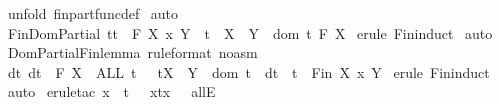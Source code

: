\begin{isabellebody}
%
\isadelimproof
%
\endisadelimproof
%
\isatagproof
{}\isamarkupfalse%
\ {\isacharparenleft}unfold\ fin{\isacharunderscore}part{\isacharunderscore}func{\isacharunderscore}def{\isacharparenright}\isanewline
{}\isamarkupfalse%
\ auto\isanewline
{}\isamarkupfalse%
%
\endisatagproof
{\isafoldproof}%
%
\isadelimproof
\isanewline
%
\endisadelimproof
\isanewline
\isanewline
{}\isamarkupfalse%
\ Fin{\isacharunderscore}Dom{\isacharunderscore}Partial{\isacharcolon}\ {\isachardoublequoteopen}{\isacharbang}{\isacharbang}t{\isachardot}{\isacharbrackleft}{\isacharbar}t\ {\isacharcolon}\ {\isacharpercent}F\ {\isacharparenleft}X\ {\isacharpercent}x\ Y{\isacharparenright}\ {\isacharsemicolon}\ t\ {\isacharcolon}\ {\isacharparenleft}X\ {\isacharminus}{\isacharbar}{\isacharminus}{\isachargreater}\ Y{\isacharparenright}{\isacharbar}{\isacharbrackright}\ {\isacharequal}{\isacharequal}{\isachargreater}\ {\isacharparenleft}dom\ t{\isacharcolon}\ {\isacharpercent}F\ X{\isacharparenright}{\isachardoublequoteclose}\isanewline
%
\isadelimproof
%
\endisadelimproof
%
\isatagproof
{}\isamarkupfalse%
\ {\isacharparenleft}erule\ Fin{\isacharunderscore}induct{\isacharparenright}\isanewline
{}\isamarkupfalse%
\ auto\isanewline
{}\isamarkupfalse%
%
\endisatagproof
{\isafoldproof}%
%
\isadelimproof
\isanewline
%
\endisadelimproof
\isanewline
{}\isamarkupfalse%
\ Dom{\isacharunderscore}Partial{\isacharunderscore}Fin{\isacharunderscore}lemma\ {\isacharbrackleft}rule{\isacharunderscore}format\ {\isacharparenleft}no{\isacharunderscore}asm{\isacharparenright}{\isacharbrackright}{\isacharcolon}\ \isanewline
{\isachardoublequoteopen}{\isacharbang}{\isacharbang}\ dt{\isachardot}\ dt\ {\isacharcolon}\ {\isacharpercent}F\ X\ {\isacharequal}{\isacharequal}{\isachargreater}\ ALL\ t\ {\isachardot}\ \ t{\isacharcolon}{\isacharparenleft}X\ {\isacharminus}{\isacharbar}{\isacharminus}{\isachargreater}\ Y{\isacharparenright}\ {\isacharminus}{\isacharminus}{\isachargreater}\ dom\ t\ {\isacharequal}\ dt\ {\isacharminus}{\isacharminus}{\isachargreater}\ t\ {\isacharcolon}\ Fin\ {\isacharparenleft}X\ {\isacharpercent}x\ Y{\isacharparenright}{\isachardoublequoteclose}\isanewline
%
\isadelimproof
%
\endisadelimproof
%
\isatagproof
{}\isamarkupfalse%
\ {\isacharparenleft}erule\ Fin{\isacharunderscore}induct{\isacharparenright}\isanewline
{}\isamarkupfalse%
\ auto\isanewline
{}\isamarkupfalse%
\ {\isacharparenleft}erule{\isacharunderscore}tac\ x\ {\isacharequal}\ {\isachardoublequoteopen}t\ {\isacharminus}\ {\isacharbraceleft}\ {\isacharparenleft}x{\isacharcomma}t{\isacharpercent}{\isacharcircum}x{\isacharparenright}\ {\isacharbraceright}{\isachardoublequoteclose}\ \ allE{\isacharparenright}\isanewline

\end{isabellebody}
